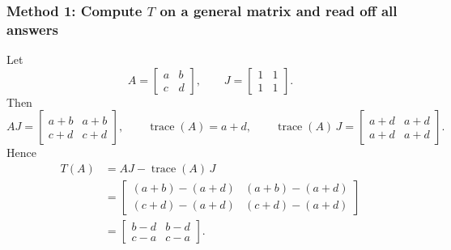 \documentclass[12pt]{article}
\DeclareMathOperator{\tr}{trace}
\begin{document}
\subsubsection{Method 1: Compute \(T\) on a general matrix and read off all answers}
Let
\[
A=\begin{bmatrix}a&b\\c&d\end{bmatrix},
\qquad
J=\begin{bmatrix}1&1\\1&1\end{bmatrix}.
\]
Then
\[
AJ=
\begin{bmatrix}
a+b & a+b\\
c+d & c+d
\end{bmatrix},
\qquad
\tr(A)=a+d,
\qquad
\tr(A)\,J=
\begin{bmatrix}
a+d & a+d\\
a+d & a+d
\end{bmatrix}.
\]
Hence
\begin{align*}
T(A)
&=AJ-\tr(A)\,J\\
&=
\begin{bmatrix}
(a+b)-(a+d) & (a+b)-(a+d)\\
(c+d)-(a+d) & (c+d)-(a+d)
\end{bmatrix}\\
&=
\begin{bmatrix}
b-d & b-d\\
c-a & c-a
\end{bmatrix}.
\end{align*}
\end{document}

